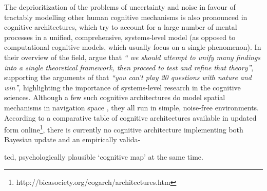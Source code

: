 The deprioritization of the problems of uncertainty and noise in favour of tractably modelling other human cognitive mechanisms is also pronounced in cognitive architectures, which try to account for a large number of mental processes in a unified, comprehensive, systems-level model (as opposed to computational cognitive models, which usually focus on a single phenomenon). In their overview of the field, \cite{langley2009cognitive} argue that \textit{`` we should attempt to unify many findings into a single theoretical framework, then proceed to test and refine that theory''}, supporting the arguments of \cite{newell1973you} that \textit{``you can't play 20 questions with nature and win''}, highlighting the importance of systems-level research in the cognitive sciences. Although a few such cognitive architectures do model spatial mechanisms in navigation space \citep{harrison2003act,schultheis2011casimir,sun2004top}, they all run in simple, noise-free environments. According to a comparative table of cognitive architectures \citep{samsonovich2011comparative} available in updated form online\footnote{http://bicasociety.org/cogarch/architectures.htm}, there is currently no cognitive architecture implementing both Bayesian update and an empirically valida-

\clearpage

\noindent ted, psychologically plausible `cognitive map' at the same time.

